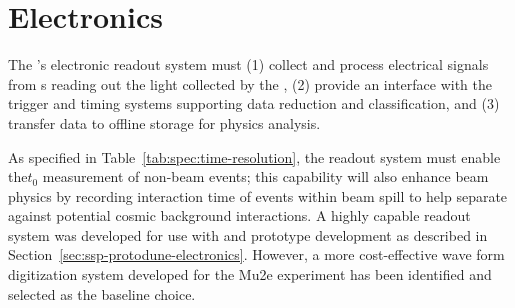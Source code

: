 

\section{Electronics}
\label{sec:fdsp-pd-pde}




The 's electronic readout system must (1) collect and process electrical signals from s reading out the light collected by the , (2) provide an interface with the trigger and timing systems supporting data reduction and classification, and (3) transfer data to offline storage for physics analysis.

As specified in Table~\ref{tab:spec:time-resolution}, the readout system must enable the$t_0$ measurement of non-beam events; this capability will also enhance beam physics by recording interaction time of events within 
beam spill to help separate against potential cosmic background interactions. A highly capable readout system was developed for use with  and prototype development 
 as described in Section~\ref{sec:ssp-protodune-electronics}. However, a more cost-effective wave form digitization system developed for the Mu2e experiment has been identified and selected as the baseline choice. 



